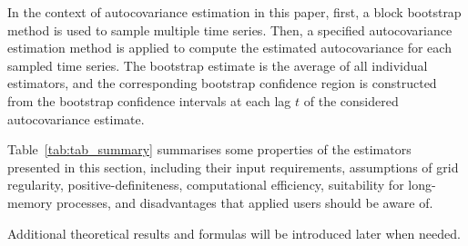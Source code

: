 In the context of autocovariance estimation in this paper, first, a
block bootstrap method is used to sample multiple time series. Then, a
specified autocovariance estimation method is applied to compute the
estimated autocovariance for each sampled time series. The bootstrap
estimate is the average of all individual estimators, and the
corresponding bootstrap confidence region is constructed from the
bootstrap confidence intervals at each lag \(t\) of the considered
autocovariance estimate.

Table~\ref{tab:tab_summary} summarises some properties of the estimators
presented in this section, including their input requirements,
assumptions of grid regularity, positive-definiteness, computational
efficiency, suitability for long-memory processes, and disadvantages
that applied users should be aware of.

Additional theoretical results and formulas will be introduced later
when needed.

\setlength{\tabcolsep}{3pt}

\centering

